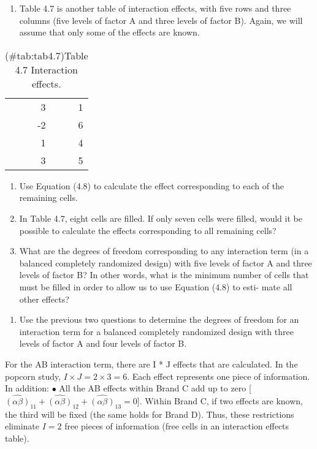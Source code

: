 \documentclass[
]{report}
\providecommand{\tightlist}{%
  \setlength{\itemsep}{0pt}\setlength{\parskip}{0pt}}
\begin{document}
\begin{enumerate}
\def\labelenumi{\arabic{enumi}.}
\setcounter{enumi}{31}
\tightlist
\item
  Table 4.7 is another table of interaction effects, with five rows and three columns (five levels of factor A and three levels of factor B). Again, we will assume that only some of the effects are known.
\end{enumerate}

\begin{table}[!h]
\centering
\caption{(\#tab:tab4.7)Table 4.7 Interaction effects.}
\centering
\begin{tabular}[t]{rr}
\toprule
  &  \\
\midrule
3 & 1\\
-2 & 6\\
1 & 4\\
3 & 5\\
\bottomrule
\end{tabular}
\end{table}

\begin{enumerate}
\def\labelenumi{\alph{enumi}.}
\tightlist
\item
  Use Equation (4.8) to calculate the effect corresponding to each of the remaining cells.\\
\item
  In Table 4.7, eight cells are filled. If only seven cells were filled, would it be possible to calculate
  the effects corresponding to all remaining cells?\\
\item
  What are the degrees of freedom corresponding to any interaction term (in a balanced completely
  randomized design) with five levels of factor A and three levels of factor B? In other words, what is
  the minimum number of cells that must be filled in order to allow us to use Equation (4.8) to esti-
  mate all other effects?
\end{enumerate}

\begin{enumerate}
\def\labelenumi{\arabic{enumi}.}
\setcounter{enumi}{32}
\tightlist
\item
  Use the previous two questions to determine the degrees of freedom for an interaction term for a balanced completely randomized design with three levels of factor A and four levels of factor B.
\end{enumerate}

For the AB interaction term, there are I * J effects that are calculated. In the popcorn study, \(I \times J = 2 \times 3 = 6\). Each effect represents one piece of information. In addition:
\(\bullet\) All the AB effects within Brand C add up to zero {[}\(\hat{(\alpha\beta)}_{11} + \hat{(\alpha\beta)}_{12} + \hat{(\alpha\beta)}_{13}= 0\){]}. Within Brand C,
if two effects are known, the third will be fixed (the same holds for Brand D). Thus, these restrictions
eliminate \(I = 2\) free pieces of information (free cells in an interaction effects table).
\end{document}
